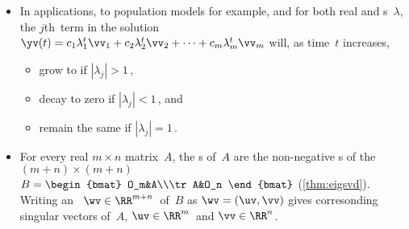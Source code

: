 \begin{itemize}
\itemme Suppose the \(n\times n\) ~\(A\) governs the dynamics of \(\yv(t)\in\RR^n\) according to \(\yv(t+1)=A\yv(t)\) (\cref{thm:dynsol}).
\begin{itemize}
\item Let \hlist\lambda m\ be s of~\(A\) and \hlist\vv m\ be corresponding s, then a solution of \(\yv(t+1)=A\yv(t)\) is the 
\begin{equation*}
\yv(t)=c_1\lambda_1^t\vv_1+c_2\lambda_2^t\vv_2+\cdots+c_m\lambda_m^t\vv_m
\end{equation*}
for all constants \hlist cm.

\sloppy
\item Further, if the number of eigenvectors \(m=n\) (the size of~\(A\)), and the matrix of eigenvectors \(P=\begin{bmatrix} \vv_1&\vv_2&\cdots&\vv_n \end{bmatrix}\) is , then the general  is a  in that unique constants \hlist cn\ may be found for every given ~\(\yv(0)\).
\end{itemize}

\item In applications, to population models for example, and for both real and s~\(\lambda\), the \(j\)th~term in the solution \(\yv(t)=c_1\lambda_1^t\vv_1+c_2\lambda_2^t\vv_2+\cdots+c_m\lambda_m^t\vv_m\) will, as time~\(t\) increases,
\begin{itemize}
\item grow to  if \(|\lambda_j|>1\)\,,
\item decay to zero if \(|\lambda_j|<1\)\,, and
\item remain the same  if \(|\lambda_j|=1\)\,.
\end{itemize}


\item For every real \(m\times n\) matrix~\(A\), the s of~\(A\) are the non-negative s of the \((m+n)\times(m+n)\)  \(B=\begin{bmat} O_m&A\\\tr A&O_n \end{bmat}\) (\cref{thm:eigsvd}). 
Writing an ~\(\wv\in\RR^{m+n}\)\ of~\(B\) as \(\wv=(\uv,\vv)\) gives corresonding singular vectors of~\(A\), \(\uv\in\RR^m\)\ and \(\vv\in\RR^n\).



\end{itemize}
